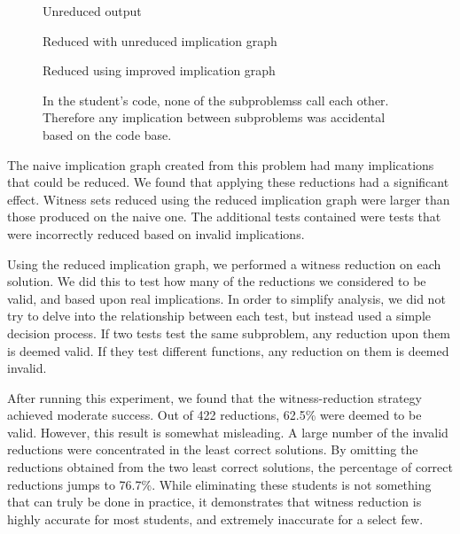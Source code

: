 \documentclass[11pt,twoside]{article}
\theoremstyle{definition}
\begin{document}
\begin{figure}

\caption{Unreduced output}

\caption{Reduced with unreduced implication graph}

\caption{Reduced using improved implication graph}
\caption{In the student's code, none of the subproblemss call each other. Therefore any implication between subproblems was accidental based on the code base.}
\end{figure}

The naive implication graph created from this problem had many implications that could be reduced. We found that applying these reductions had a significant effect. Witness sets reduced using the reduced implication graph were larger than those produced on the naive one. The additional tests contained were tests that were incorrectly reduced based on invalid implications.

Using the reduced implication graph, we performed a witness reduction on each solution. We did this to test how many of the reductions we considered to be valid, and based upon real implications. In order to simplify analysis, we did not try to delve into the relationship between each test, but instead used a simple decision process. If two tests test the same subproblem, any reduction upon them is deemed valid. If they test different functions, any reduction on them is deemed invalid.



After running this experiment, we found that the witness-reduction strategy achieved moderate success. Out of 422 reductions, 62.5\% were deemed to be valid. However, this result is somewhat misleading. A large number of the invalid reductions were concentrated in the least correct solutions. By omitting the reductions obtained from the two least correct solutions, the percentage of correct reductions jumps to 76.7\%. While eliminating these students is not something that can truly be done in practice, it demonstrates that witness reduction is highly accurate for most students, and extremely inaccurate for a select few.
\end{document}
